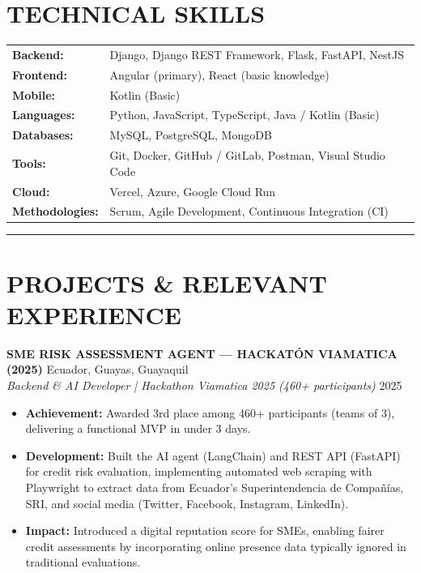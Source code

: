 \documentclass[11pt, a4paper]{article}
\begin{document}
\section*{TECHNICAL SKILLS}
\vspace{-2pt}
\begin{tabular}{p{} p{}}
\textbf{Backend:} & Django, Django REST Framework, Flask, FastAPI, NestJS \\
\textbf{Frontend:} & Angular (primary), React (basic knowledge) \\
\textbf{Mobile:} & Kotlin (Basic) \\
\textbf{Languages:} & Python, JavaScript, TypeScript, Java / Kotlin (Basic) \\
\textbf{Databases:} & MySQL, PostgreSQL, MongoDB \\
\textbf{Tools:} & Git, Docker, GitHub / GitLab, Postman, Visual Studio Code \\
\textbf{Cloud:} & Vercel, Azure, Google Cloud Run \\
\textbf{Methodologies:} & Scrum, Agile Development, Continuous Integration (CI) \\
\end{tabular}
\vspace{6pt}
\hrule
\vspace{8pt}

\section*{PROJECTS \& RELEVANT EXPERIENCE}

\textbf{SME RISK ASSESSMENT AGENT --- HACKATÓN VIAMATICA (2025)} \hfill Ecuador, Guayas, Guayaquil \\
\textit{Backend \& AI Developer | Hackathon Viamatica 2025 (460+ participants)} \hfill 2025

\begin{itemize}
\item \textbf{Achievement:} Awarded 3rd place among 460+ participants (teams of 3), delivering a functional MVP in under 3 days.
\item \textbf{Development:} Built the AI agent (LangChain) and REST API (FastAPI) for credit risk evaluation, implementing automated web scraping with Playwright to extract data from Ecuador's Superintendencia de Compañías, SRI, and social media (Twitter, Facebook, Instagram, LinkedIn).
\item \textbf{Impact:} Introduced a digital reputation score for SMEs, enabling fairer credit assessments by incorporating online presence data typically ignored in traditional evaluations.
\end{itemize}
\end{document}
